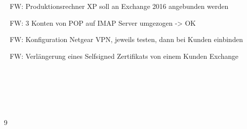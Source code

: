 {{	\textbullet~ FW: Produktionsrechner XP soll an Exchange 2016 angebunden werden\par
	\textbullet~ FW: 3 Konten von POP auf IMAP Server umgezogen -> OK\par
	\textbullet~ FW: Konfiguration Netgear VPN, jeweils testen, dann bei Kunden einbinden\par
	\textbullet~ FW: Verlängerung eines Selfsigned Zertifikats von einem Kunden Exchange\par
	\textbullet~ \par
	\textbullet~ \par
	\textbullet~ 
	}{}{9}
}{}
\Unterschrift
\newpage
